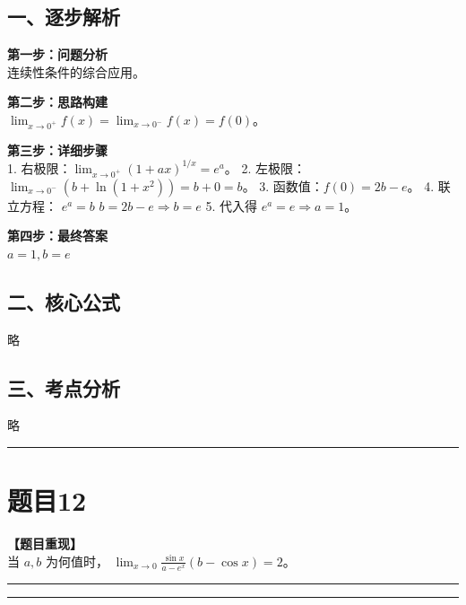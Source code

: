 \documentclass[12pt, a4paper]{ctexart}
\newcommand{\TopSeparator}{
    \par\noindent\rule{\textwidth}{1.5pt}\vspace{0.5em} %
}
\newcommand{\AnalysisSeparator}{
    \par\noindent\rule{\textwidth}{0.5pt}\vspace{0.2em}\hrule\vspace{0.5em} %
}
\newenvironment{RedAnalysis}{
    \par
    \color{red} %
}{
    \par
    \color{black} %
}
\begin{document}
\begin{RedAnalysis}

\subsection*{一、逐步解析}

\textbf{第一步：问题分析} \\
连续性条件的综合应用。

\textbf{第二步：思路构建} \\
$\lim_{x\to 0^+} f(x) = \lim_{x\to 0^-} f(x) = f(0)$。

\textbf{第三步：详细步骤} \\
1. 右极限：$\lim_{x\to 0^+} (1+ax)^{1/x} = e^a$。
2. 左极限：$\lim_{x\to 0^-} (b + \ln(1+x^2)) = b + 0 = b$。
3. 函数值：$f(0) = 2b - e$。
4. 联立方程：
   $e^a = b$
   $b = 2b - e \Rightarrow b = e$
5. 代入得 $e^a = e \Rightarrow a = 1$。

\textbf{第四步：最终答案} \\
$a=1, b=e$

\subsection*{二、核心公式}
略

\subsection*{三、考点分析}
略

\end{RedAnalysis}

\vspace{2em}

\TopSeparator
\section*{题目12}

\textbf{【题目重现】} \\
当 $ a, b $ 为何值时， $ \lim_{x \to 0} \frac{\sin x}{a - e^{x}} (b - \cos x) = 2 $。

\AnalysisSeparator
\end{document}
